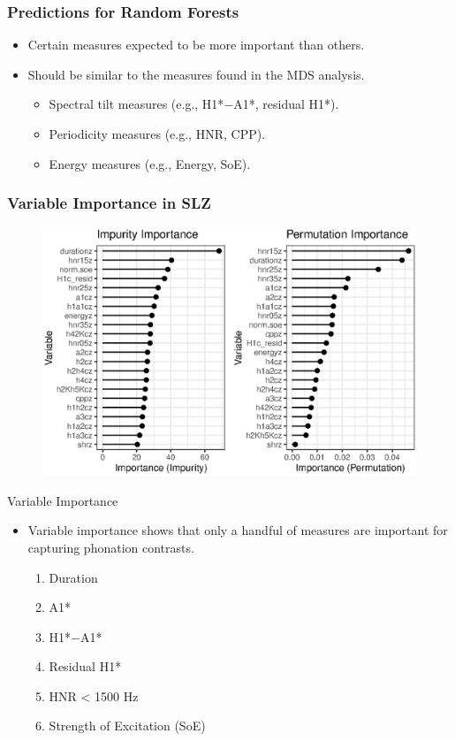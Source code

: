 \documentclass[professionalfonts]{beamer}
\begin{document}
\begin{frame}
  \frametitle{Predictions for Random Forests}
  \begin{itemize}
    \item Certain measures expected to be more important than others.
    \item Should be similar to the measures found in the MDS analysis.
    \begin{itemize}
      \item Spectral tilt measures (e.g., H1*$-$A1*, residual H1*).
      \item Periodicity measures (e.g., HNR, CPP).
      \item Energy measures (e.g., Energy, SoE).
    \end{itemize}
  \end{itemize}
\end{frame}

\begin{frame}
  \frametitle{Variable Importance in SLZ}
  \begin{figure}
    \centering
    \includegraphics[width = 0.8\linewidth]{images/RandomForest/rf_dur_plots.eps}
  \end{figure}
\end{frame}

\begin{frame}{Variable Importance}
  \begin{itemize}
    \item Variable importance shows that only a handful of measures are important for capturing phonation contrasts.
    \begin{enumerate}
      \item Duration
      \item A1*
		  \item H1*$-$A1*
      \item Residual H1*
		  \item HNR < 1500 Hz
		  \item Strength of Excitation (SoE)
    \end{enumerate} 
  \end{itemize}
\end{frame}
\end{document}
